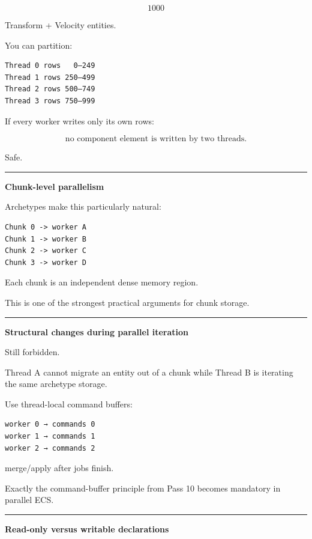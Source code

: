 \[
1000
\]

Transform + Velocity entities.

You can partition:

\begin{verbatim}
Thread 0 rows   0–249
Thread 1 rows 250–499
Thread 2 rows 500–749
Thread 3 rows 750–999
\end{verbatim}

If every worker writes only its own rows:

\[
\text{no component element is written by two threads}.
\]

Safe.

\begin{center}\rule{0.5\linewidth}{0.5pt}\end{center}

\textbf{Chunk-level parallelism}

Archetypes make this particularly natural:

\begin{verbatim}
Chunk 0 -> worker A
Chunk 1 -> worker B
Chunk 2 -> worker C
Chunk 3 -> worker D
\end{verbatim}

Each chunk is an independent dense memory region.

This is one of the strongest practical arguments for chunk storage.

\begin{center}\rule{0.5\linewidth}{0.5pt}\end{center}

\textbf{Structural changes during parallel iteration}

Still forbidden.

Thread A cannot migrate an entity out of a chunk while Thread B is iterating the same archetype storage.

Use thread-local command buffers:

\begin{verbatim}
worker 0 → commands 0
worker 1 → commands 1
worker 2 → commands 2
\end{verbatim}

merge/apply after jobs finish.

Exactly the command-buffer principle from Pass 10 becomes mandatory in parallel ECS.

\begin{center}\rule{0.5\linewidth}{0.5pt}\end{center}

\textbf{Read-only versus writable declarations}

